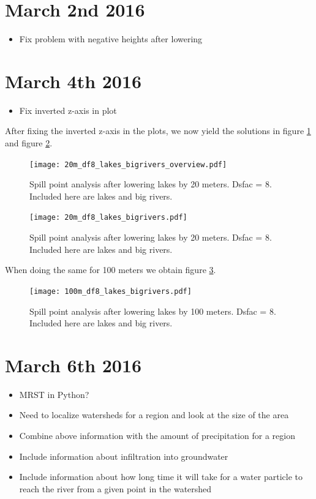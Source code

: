 \documentclass[10pt,a4paper]{article}
\begin{document}
\section{March 2nd 2016}
\begin{itemize}
\item Fix problem with negative heights after lowering
\end{itemize}


\section{March 4th 2016}
\begin{itemize}
\item Fix inverted z-axis in plot
\end{itemize}

After fixing the inverted z-axis in the plots, we now yield the solutions in figure \ref{fig:trap_analysis_overview_20m_df8} and figure \ref{fig:trap_analysis_traps_20m_df8}.

\begin{figure}[H]
  \centering
    \texttt{[image: 20m\_df8\_lakes\_bigrivers\_overview.pdf]}
  \caption{Spill point analysis after lowering lakes by 20 meters. Dsfac = 8. Included here are lakes and big rivers.}
  \label{fig:trap_analysis_overview_20m_df8}
\end{figure}

\begin{figure}[H]
  \centering
    \texttt{[image: 20m\_df8\_lakes\_bigrivers.pdf]}
  \caption{Spill point analysis after lowering lakes by 20 meters. Dsfac = 8. Included here are lakes and big rivers.}
  \label{fig:trap_analysis_traps_20m_df8}
\end{figure}

When doing the same for 100 meters we obtain figure \ref{fig:trap_analysis_traps_100m_df8}.

\begin{figure}[H]
  \centering
    \texttt{[image: 100m\_df8\_lakes\_bigrivers.pdf]}
  \caption{Spill point analysis after lowering lakes by 100 meters. Dsfac = 8. Included here are lakes and big rivers.}
  \label{fig:trap_analysis_traps_100m_df8}
\end{figure}

\section{March 6th 2016}
\begin{itemize}
\item MRST in Python?
\item Need to localize watersheds for a region and look at the size of the area
\item Combine above information with the amount of precipitation for a region
\item Include information about infiltration into groundwater
\item Include information about how long time it will take for a water particle to reach the river from a given point in the watershed
\end{itemize}
\end{document}
